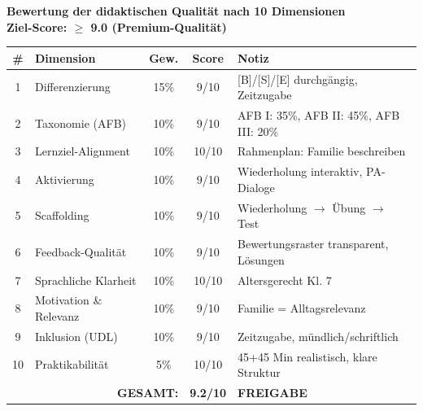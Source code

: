 \documentclass[11pt,a4paper]{article}
\begin{document}
\begin{scorebox}
\textbf{Bewertung der didaktischen Qualität nach 10 Dimensionen}\\
\textbf{Ziel-Score: $\geq$ 9.0 (Premium-Qualität)}

\vspace{1em}
\begin{tabular}{|c|l|c|c|p{4.5cm}|}
\hline
\textbf{\#} & \textbf{Dimension} & \textbf{Gew.} & \textbf{Score} & \textbf{Notiz} \\
\hline
1 & Differenzierung & 15\% & 9/10 & [B]/[S]/[E] durchgängig, Zeitzugabe \\
\hline
2 & Taxonomie (AFB) & 10\% & 9/10 & AFB I: 35\%, AFB II: 45\%, AFB III: 20\% \\
\hline
3 & Lernziel-Alignment & 10\% & 10/10 & Rahmenplan: Familie beschreiben \\
\hline
4 & Aktivierung & 10\% & 9/10 & Wiederholung interaktiv, PA-Dialoge \\
\hline
5 & Scaffolding & 10\% & 9/10 & Wiederholung $\rightarrow$ Übung $\rightarrow$ Test \\
\hline
6 & Feedback-Qualität & 10\% & 9/10 & Bewertungsraster transparent, Lösungen \\
\hline
7 & Sprachliche Klarheit & 10\% & 10/10 & Altersgerecht Kl. 7 \\
\hline
8 & Motivation \& Relevanz & 10\% & 9/10 & Familie = Alltagsrelevanz \\
\hline
9 & Inklusion (UDL) & 10\% & 9/10 & Zeitzugabe, mündlich/schriftlich \\
\hline
10 & Praktikabilität & 5\% & 10/10 & 45+45 Min realistisch, klare Struktur \\
\hline
\multicolumn{3}{|r|}{\textbf{GESAMT:}} & \textbf{9.2/10} & \textcolor{successgreen}{\textbf{FREIGABE}} \\
\hline
\end{tabular}
\end{scorebox}
\end{document}
